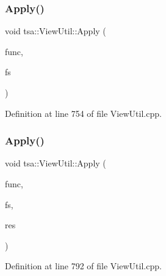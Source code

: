 \mbox{\label{classtsa_1_1_view_util_ad0b99f095c828395b1637da1d60564a4}} 
\subsubsection{\texorpdfstring{Apply()}{Apply()}\hspace{0.1cm}{\footnotesize\ttfamily [3/4]}}
{\footnotesize\ttfamily void tsa\+::\+View\+Util\+::\+Apply (\begin{DoxyParamCaption}\item[{std\+::complex$<$ double $>$($\ast$)(std\+::complex$<$ double $>$)}]{func,  }\item[{\hyperlink{namespacetsa_ab32775c889b53c40fa83939f22372b75}{Seq\+View\+Complex} \&}]{fs }\end{DoxyParamCaption})\hspace{0.3cm}{\ttfamily [static]}}



Definition at line 754 of file View\+Util.\+cpp.

\mbox{\label{classtsa_1_1_view_util_a3c240b727d35554e0e2f59ae30ca776c}} 
\subsubsection{\texorpdfstring{Apply()}{Apply()}\hspace{0.1cm}{\footnotesize\ttfamily [4/4]}}
{\footnotesize\ttfamily void tsa\+::\+View\+Util\+::\+Apply (\begin{DoxyParamCaption}\item[{std\+::complex$<$ double $>$($\ast$)(std\+::complex$<$ double $>$)}]{func,  }\item[{\hyperlink{namespacetsa_ab32775c889b53c40fa83939f22372b75}{Seq\+View\+Complex} \&}]{fs,  }\item[{\hyperlink{namespacetsa_ab32775c889b53c40fa83939f22372b75}{Seq\+View\+Complex} \&}]{res }\end{DoxyParamCaption})\hspace{0.3cm}{\ttfamily [static]}}



Definition at line 792 of file View\+Util.\+cpp.

